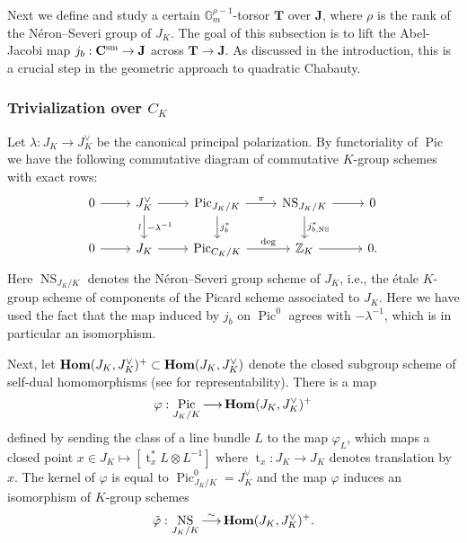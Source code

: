 \documentclass[11pt,oneside]{amsart}
\theoremstyle{plain}
\theoremstyle{definition}
\def\lra{{\longrightarrow}}
\def\G{{\bf G}}
\DeclareMathOperator{\NS}{NS}
\DeclareMathOperator{\Pic}{Pic}
\DeclareMathOperator{\Hombf}{{\bf Hom}}
\DeclareMathOperator{\tr}{t}
\def\TT{\mathbf{T}}
\def\Z{\mathbb{Z}}
\def\J{\mathbf{J}}
\def\sL{\mathscr{L}}
\def\G{\mathbb{G}}
\def\CC{\mathbf{C}}
\def\ra{\rightarrow}
\begin{document}
Next we define and study a certain $\G_m^{\rho-1}$-torsor $\TT$ over $\J$, where $\rho$ is the rank of the N\'eron--Severi group of $J_K$. The goal of this subsection is to lift the Abel-Jacobi map $j_b: \CC^{\textup{sm}} \ra \J$ across $\TT \ra \J$. As discussed in the introduction, this is a crucial step in the geometric approach to quadratic Chabauty. 

\subsubsection{Trivialization over $C_K$}

Let  $\lambda : J_K\lra J_K^\vee$ be the canonical principal polarization. By functoriality of $\Pic$ we have the following commutative diagram of commutative $K$-group schemes with exact rows: 
\begin{equation}\label{diag:NS}
\begin{tikzcd}[bend angle = 20]
  0 \arrow{r}
  & J_K^\vee \arrow{r} \arrow{d}{-\lambda^{-1}}[swap]{\wr}
  & \Pic_{J_K/K} \arrow{r}{\pi} \arrow{d}{j_b^*}
  & \NS_{J_K/K} \arrow{r} \arrow{d}{j_{b, \NS}^*}
  & 0 \\
  0 \arrow{r}
  & J_K \arrow{r}
  & \Pic_{C_K/K} \arrow{r}{\deg}
  & \Z_K \arrow{r}
  & 0.
\end{tikzcd}
\end{equation}
Here $\NS_{J_K/K}$ denotes the N\'eron--Severi group scheme of $J_K$, i.e., the \'etale $K$-group scheme of components of the Picard scheme associated to $J_K$. Here we have used the fact that the map induced by $j_b$ on $\Pic^0$ agrees with $-\lambda^{-1}$, which is in particular an isomorphism. 

Next, let $\Hombf(J_K, J_K^\vee)^{+} \subset \Hombf(J_K, J_K^\vee)$ denote the closed subgroup scheme of self-dual homomorphisms (see \cite[Proposition 7.14 \& \S 7.18]{EGM} for representability). There is a map 
$$
    \varphi : \Pic_{J_K/K}\lra \Hombf(J_K, J_K^\vee)^+ %
$$
defined by sending the class of a line bundle $L$ to the map $\varphi_L$, which maps a closed point $x\in J_K \mapsto  [\tr_x^* L\otimes L^{-1}]$ where $\tr_x : J_K\lra J_K$ denotes translation by $x$. The kernel of $\varphi$ is equal to $\Pic^0_{J_K/K}=J_K^\vee$ and the map $\varphi$ induces an isomorphism of $K$-group schemes \cite[Corollary 11.3]{EGM}
\begin{equation}\label{map:phitilde}
    \tilde{\varphi} : \NS_{J_K/K}\overset{\sim}{\lra} \Hombf(J_K, J_K^\vee)^+.
\end{equation}
\end{document}
